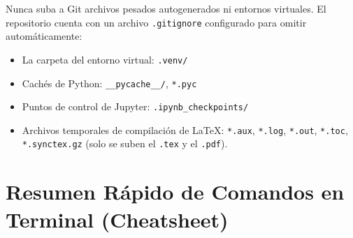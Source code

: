 \documentclass[11pt,a4paper]{article}
\begin{document}
\begin{alertbox}[title=Buenas Prácticas Obligatorias: Archivo .gitignore]
Nunca suba a Git archivos pesados autogenerados ni entornos virtuales. El repositorio cuenta con un archivo \texttt{.gitignore} configurado para omitir automáticamente:
\begin{itemize}[leftmargin=*,itemsep=1pt]
  \item La carpeta del entorno virtual: \texttt{.venv/}
  \item Cachés de Python: \texttt{\_\_pycache\_\_/}, \texttt{*.pyc}
  \item Puntos de control de Jupyter: \texttt{.ipynb\_checkpoints/}
  \item Archivos temporales de compilación de LaTeX: \texttt{*.aux}, \texttt{*.log}, \texttt{*.out}, \texttt{*.toc}, \texttt{*.synctex.gz} (solo se suben el \texttt{.tex} y el \texttt{.pdf}).
\end{itemize}
\end{alertbox}

\section{Resumen Rápido de Comandos en Terminal (Cheatsheet)}
\end{document}
